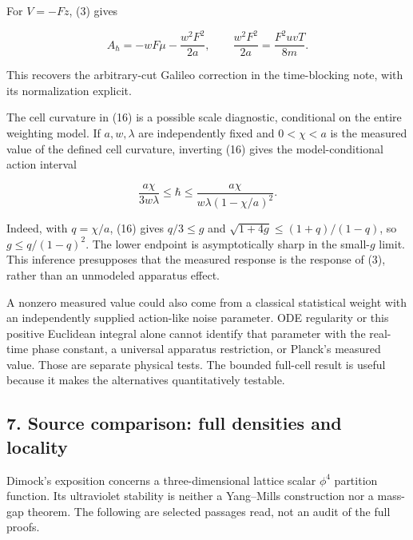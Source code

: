 \documentclass[11pt,a4paper]{article}
\begin{document}
For \(V=-Fz\), (3) gives

\[
 A_\hbar=-wF\mu-\frac{w^2F^2}{2a},\qquad
 \frac{w^2F^2}{2a}=\frac{F^2uvT}{8m}.
 \tag{23}
\]

This recovers the arbitrary-cut Galileo correction in the time-blocking
note, with its normalization explicit.

The cell curvature in (16) is a possible scale diagnostic, conditional
on the entire weighting model. If \(a,w,\lambda\) are independently
fixed and \(0<\chi<a\) is the measured value of the defined cell
curvature, inverting (16) gives the model-conditional action interval

\[
 \frac{a\chi}{3w\lambda}\le\hbar
       \le\frac{a\chi}{w\lambda(1-\chi/a)^2}.
 \tag{24}
\]

Indeed, with \(q=\chi/a\), (16) gives \(q/3\le g\) and
\(\sqrt{1+4g}\le(1+q)/(1-q)\), so \(g\le q/(1-q)^2\). The lower endpoint
is asymptotically sharp in the small-\(g\) limit. This inference
presupposes that the measured response is the response of (3), rather
than an unmodeled apparatus effect.

A nonzero measured value could also come from a classical statistical
weight with an independently supplied action-like noise parameter. ODE
regularity or this positive Euclidean integral alone cannot identify
that parameter with the real-time phase constant, a universal apparatus
restriction, or Planck's measured value. Those are separate physical
tests. The bounded full-cell result is useful because it makes the
alternatives quantitatively testable.

\hypertarget{source-comparison-full-densities-and-locality}{%
\subsection{7. Source comparison: full densities and
locality}\label{source-comparison-full-densities-and-locality}}

Dimock's exposition concerns a three-dimensional lattice scalar
\(\phi^4\) partition function. Its ultraviolet stability is neither a
Yang--Mills construction nor a mass-gap theorem. The following are
selected passages read, not an audit of the full proofs.
\end{document}
